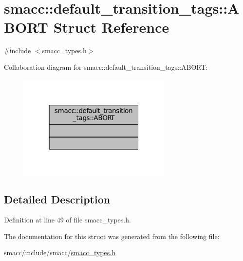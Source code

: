 \hypertarget{structsmacc_1_1default__transition__tags_1_1ABORT}{}\section{smacc\+:\+:default\+\_\+transition\+\_\+tags\+:\+:A\+B\+O\+RT Struct Reference}
\label{structsmacc_1_1default__transition__tags_1_1ABORT}


{\ttfamily \#include $<$smacc\+\_\+types.\+h$>$}



Collaboration diagram for smacc\+:\+:default\+\_\+transition\+\_\+tags\+:\+:A\+B\+O\+RT\+:
\nopagebreak
\begin{figure}[H]
\begin{center}
\leavevmode
\includegraphics[width=217pt]{structsmacc_1_1default__transition__tags_1_1ABORT__coll__graph}
\end{center}
\end{figure}


\subsection{Detailed Description}


Definition at line 49 of file smacc\+\_\+types.\+h.



The documentation for this struct was generated from the following file\+:\begin{DoxyCompactItemize}
\item 
smacc/include/smacc/\hyperlink{smacc__types_8h}{smacc\+\_\+types.\+h}\end{DoxyCompactItemize}
